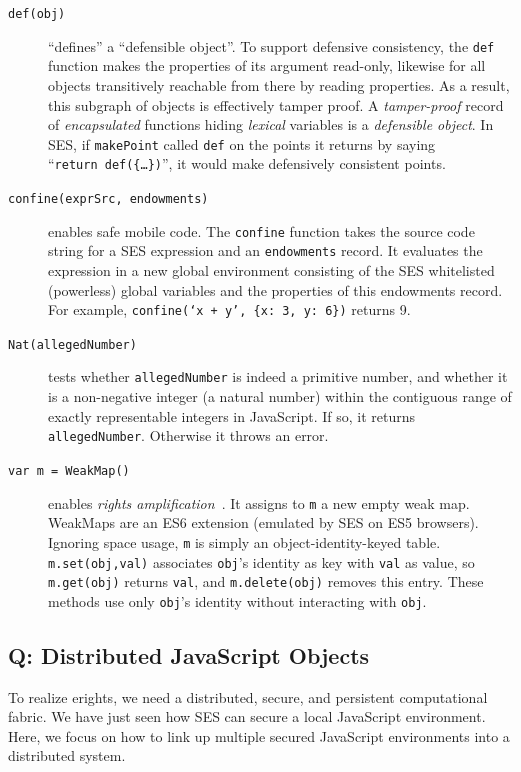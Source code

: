 \documentclass{llncs}
\begin{document}
\begin{description}
\item[{\tt def(obj)}]  ``defines'' a ``defensible object''. To support defensive consistency, the {\tt def} function makes the properties of its argument read-only, likewise for all objects transitively reachable from there by reading properties. As a result, this subgraph of objects is effectively tamper proof. A \emph{tamper-proof} record of \emph{encapsulated} functions hiding \emph{lexical} variables is a \emph{defensible object}. In SES, if {\tt makePoint} called {\tt def} on the points it returns by saying ``{\tt return~def(\{\ldots\})}'', it would make defensively consistent points.

\item[{\tt confine(exprSrc, endowments)}] enables safe mobile code. The {\tt confine} function takes the source code string for a SES expression and an {\tt endowments} record. It evaluates the expression in a new global environment consisting of the SES whitelisted (powerless) global variables and the properties of this endowments record. For example, {\tt confine(`x~+~y',~\{x:~3,~y:~6\})} returns 9.

\item[{\tt Nat(allegedNumber)}] tests whether {\tt allegedNumber} is indeed a primitive number, and whether it is a non-negative integer (a natural number) within the contiguous range of exactly representable integers in JavaScript. If so, it returns {\tt allegedNumber}. Otherwise it throws an error.

\item[{\tt var m = WeakMap()}] enables \emph{rights amplification}~\cite{Jones:Thesis}. It assigns to {\tt m} a new empty weak map. WeakMaps are an ES6 extension (emulated by SES on ES5 browsers). Ignoring space usage, {\tt m} is simply an object-identity-keyed table. {\tt m.set(obj,val)} associates {\tt obj}'s identity as key with {\tt val} as value, so {\tt m.get(obj)} returns {\tt val}, and {\tt m.delete(obj)} removes this entry. These methods use only {\tt obj}'s identity without interacting with {\tt obj}.


\end{description}

\subsection{Q: Distributed JavaScript Objects}
\label{Q}

To realize erights, we need a distributed, secure, and persistent computational fabric. We have just seen how SES can secure a local JavaScript environment. Here, we focus on how to link up multiple secured JavaScript environments into a distributed system.
\end{document}
